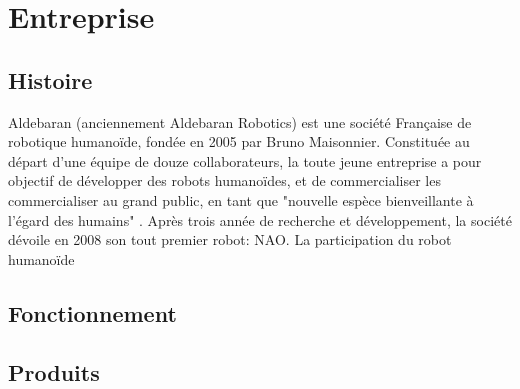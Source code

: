 \chapter*{Entreprise}
\label{Entreprise}
\thispagestyle{fancy}

\section{Histoire}
\label{Entreprise: histoire}
Aldebaran (anciennement Aldebaran Robotics) est une société Française de robotique humanoïde, fondée en 2005 par Bruno Maisonnier. 
Constituée au départ d'une équipe de douze collaborateurs, la toute jeune entreprise a pour objectif de développer des robots humanoïdes, et de commercialiser les commercialiser au grand public, en tant que "nouvelle espèce bienveillante à l'égard des humains" . Après trois année de recherche et développement, la société dévoile en 2008 son tout premier robot: NAO. La participation du robot humanoïde 

\section{Fonctionnement}

\section{Produits}